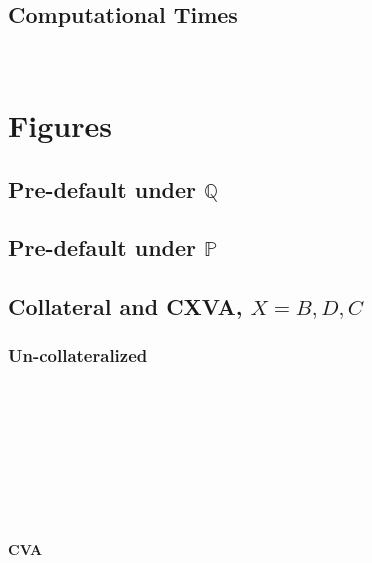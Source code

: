 \subsection{Computational Times}
	
	\ctimeFOBB\hfill\\
\section{Figures}
\subsection{Pre-default under $\mathbb{Q}$}
	
\subsection{Pre-default under $\mathbb{P}$}
	
\subsection{Collateral and CXVA, $X=B,D,C$}
\subsubsection{Un-collateralized}
	
	\shortRateUCFOBB\hfill\\
	\LGDIUCFOBB\hfill\\
	\LGDCUCFOBB\hfill\\
	\simulationsUCFOBB\hfill\\
	\cbvaUCFOBB\hfill\\
	\cdvaUCFOBB\hfill\\
	\ccvaUCFOBB\hfill\\
\begin{table}[h!]
	\tresholdsIUCFOBB%
\centering
\tresholdsIUCFOBBCaption
\label{tab:thresholds8}
\end{table}
\begin{table}[h!]
	\tresholdsCUCFOBB%
\centering
\tresholdsCUCFOBBCaption
\label{tab:thresholds9}
\end{table}
	
\paragraph*{CVA}
	
